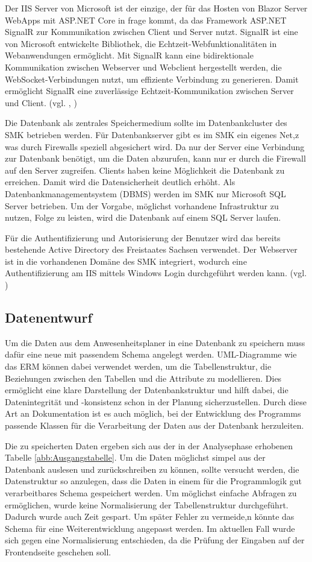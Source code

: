 Der IIS Server von Microsoft ist der einzige, der für das Hosten von Blazor Server WebApps mit ASP.NET Core in frage kommt, da das Framework ASP.NET SignalR zur Kommunikation zwischen Client und Server nutzt. SignalR ist eine von Microsoft entwickelte Bibliothek, die Echtzeit-Webfunktionalitäten in Webanwendungen ermöglicht. Mit SignalR kann eine bidirektionale Kommunikation zwischen Webserver und Webclient hergestellt werden, die WebSocket-Verbindungen nutzt, um effiziente Verbindung zu generieren. Damit ermöglicht SignalR eine zuverlässige Echtzeit-Kommunikation zwischen Server und Client. (vgl. \cite{SignalR}, \cite{SignalRPlatf})

Die Datenbank als zentrales Speichermedium sollte im Datenbankcluster des SMK betrieben werden. Für Datenbankserver gibt es im SMK ein eigenes Net,z was durch Firewalls speziell abgesichert wird. Da nur der Server eine Verbindung zur Datenbank benötigt, um die Daten abzurufen, kann nur er durch die Firewall auf den Server zugreifen. Clients haben keine Möglichkeit die Datenbank zu erreichen. Damit wird die Datensicherheit deutlich erhöht. Als Datenbankmanagementsystem (DBMS) werden im SMK nur Microsoft SQL Server betrieben. Um der Vorgabe, möglichst vorhandene Infrastruktur zu nutzen, Folge zu leisten, wird die Datenbank auf einem SQL Server laufen.

Für die Authentifizierung und Autorisierung der Benutzer wird das bereits bestehende Active Directory des Freistaates Sachsen verwendet. Der Webserver ist in die vorhandenen Domäne des SMK integriert, wodurch eine Authentifizierung am IIS mittels Windows Login durchgeführt werden kann. (vgl. \cite{IIS})

\subsection{Datenentwurf}
\label{sec:Datenentwurf}
Um die Daten aus dem Anwesenheitsplaner in eine Datenbank zu speichern muss dafür eine neue mit passendem Schema angelegt werden. UML-Diagramme wie das ERM können dabei verwendet werden, um die Tabellenstruktur, die Beziehungen zwischen den Tabellen und die Attribute zu modellieren. Dies ermöglicht eine klare Darstellung der Datenbankstruktur und hilft dabei, die Datenintegrität und -konsistenz schon in der Planung sicherzustellen. Durch diese Art an Dokumentation ist es auch möglich, bei der Entwicklung des Programms passende Klassen für die Verarbeitung der Daten aus der Datenbank herzuleiten.

Die zu speicherten Daten ergeben sich aus der in der Analysephase erhobenen Tabelle \ref{abb:Ausgangstabelle}. Um die Daten möglichst simpel aus der Datenbank auslesen und zurückschreiben zu können, sollte versucht werden, die Datenstruktur so anzulegen, dass die Daten in einem für die Programmlogik gut verarbeitbares Schema gespeichert werden. Um möglichst einfache Abfragen zu ermöglichen, wurde keine Normalisierung der Tabellenstruktur durchgeführt. Dadurch wurde auch Zeit gespart. Um später Fehler zu vermeide,n könnte das Schema für eine Weiterentwicklung angepasst werden. Im aktuellen Fall wurde sich gegen eine Normalisierung entschieden, da die Prüfung der Eingaben auf der Frontendseite geschehen soll.


